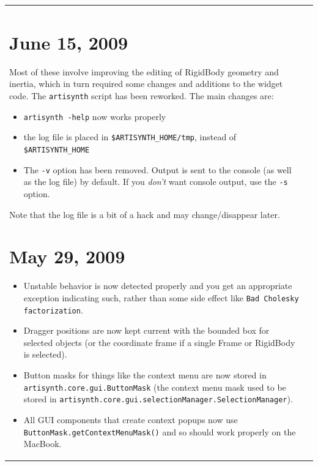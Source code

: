 \documentclass{article}
\begin{document}
\begin{tabular}{ll}
\section*{June 15, 2009}

Most of these involve improving the editing of RigidBody geometry and 
inertia, which in turn required some changes and additions to the
widget code. The {\tt artisynth} script has been reworked. The main
changes are:

\begin{itemize}

\item {\tt artisynth -help} now works properly

\item the log file is placed in {\tt \$ARTISYNTH\_HOME/tmp}, instead of 
{\tt \$ARTISYNTH\_HOME}

\item The {\tt -v} option has been removed. Output is sent to the console (as 
well as the log file) by default. If you {\it don't} want console output, 
use the {\tt -s} option. 

\end{itemize}

Note that the log file is a bit of a hack and may change/disappear later.

\section*{May 29, 2009}

\begin{itemize}

\item Unstable behavior is now detected properly and you get an
appropriate exception indicating such, rather than some side effect 
like {\tt Bad Cholesky factorization}.

\item Dragger positions are now kept current with the bounded box for 
selected objects (or the coordinate frame if a single Frame or
RigidBody is selected).

\item Button masks for things like the context menu are now stored in 
{\tt artisynth.core.gui.ButtonMask} (the context menu mask used to be stored 
in {\tt artisynth.core.gui.selectionManager.SelectionManager}).

\item All GUI components that create context popups now use 
{\tt ButtonMask.getContextMenuMask()} and so should work properly on the 
MacBook.


\end{itemize}
\end{tabular}
\end{document}
